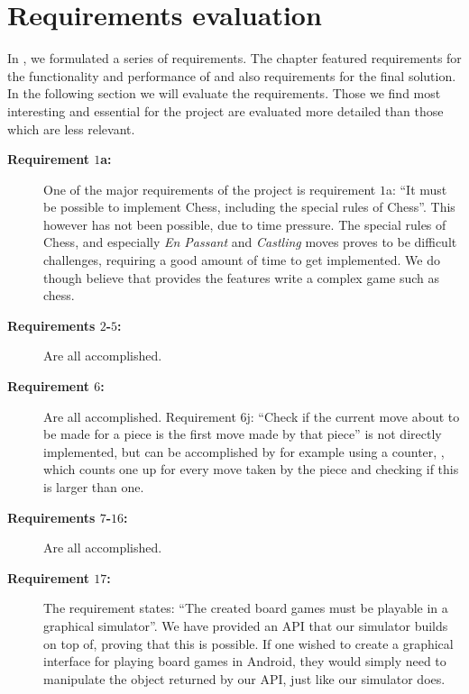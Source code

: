 \section{Requirements evaluation}
\label{sec:requirementsevaluation}

In , we formulated a series of requirements.
The chapter featured requirements for the functionality and performance
of \productname{} and also requirements for the final solution. In the
following section we will evaluate the requirements. Those we find most
interesting and essential for the project are evaluated more detailed
than those which are less relevant.

\begin{description}
  \item[\textbf{Requirement $1$a:}]
    One of the major requirements of the project is requirement
    $1$a: ``It must be possible to implement Chess, including the
    special rules of Chess''. This however has not been possible,
    due to time pressure. The special rules of Chess, and especially
    \emph{En Passant} and \emph{Castling} moves proves to be difficult
    challenges, requiring a good amount of time to get implemented. We
    do though believe that \productname{} provides the features write a
    complex game such as chess.

  \item[\textbf{Requirements $2$-$5$:}]
    Are all accomplished.

  \item[\textbf{Requirement $6$:}]
    Are all accomplished. Requirement $6$j: ``Check if the current move
    about to be made for a piece is the first move made by that piece'' is
    not directly implemented, but can be accomplished by for example using a
    counter, , which counts one up for every move taken by
    the piece and checking if this is larger than one.

  \item[\textbf{Requirements $7$-$16$:}]
    Are all accomplished.

  \item[\textbf{Requirement $17$:}]
    The requirement states: ``The created board games must be playable
    in a graphical simulator''. We have provided an API that our
    simulator builds on top of, proving that this is possible. If one
    wished to create a graphical interface for playing board games in
    Android, they would simply need to manipulate the object returned by
    our API, just like our simulator does.


\end{description}
